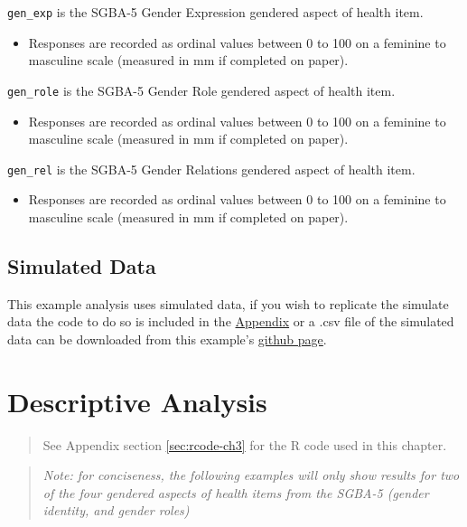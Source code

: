 \documentclass[
]{book}
\providecommand{\tightlist}{%
  \setlength{\itemsep}{0pt}\setlength{\parskip}{0pt}}
\begin{document}
\texttt{gen\_exp} is the SGBA-5 Gender Expression gendered aspect of health item.

\begin{itemize}
\tightlist
\item
  Responses are recorded as ordinal values between 0 to 100 on a feminine to masculine scale (measured in mm if completed on paper).
\end{itemize}

\texttt{gen\_role} is the SGBA-5 Gender Role gendered aspect of health item.

\begin{itemize}
\tightlist
\item
  Responses are recorded as ordinal values between 0 to 100 on a feminine to masculine scale (measured in mm if completed on paper).
\end{itemize}

\texttt{gen\_rel} is the SGBA-5 Gender Relations gendered aspect of health item.

\begin{itemize}
\tightlist
\item
  Responses are recorded as ordinal values between 0 to 100 on a feminine to masculine scale (measured in mm if completed on paper).
\end{itemize}

\section{Simulated Data}\label{simulated-data}

This example analysis uses simulated data, if you wish to replicate the simulate data the code to do so is included in the \hyperref[sec:sim-data]{Appendix} or a .csv file of the simulated data can be downloaded from this example's \href{https://github.com/putman-a/SGBA-5_example_analysis/\%s}{github page}.

\chapter{Descriptive Analysis}\label{descriptive-analysis}

\begin{quote}
See Appendix section \ref{sec:rcode-ch3} for the R code used in this chapter.
\end{quote}

\begin{quote}
\emph{Note: for conciseness, the following examples will only show results for two of the four gendered aspects of health items from the SGBA-5 (gender identity, and gender roles)}
\end{quote}
\end{document}
